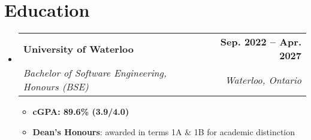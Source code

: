 \documentclass[letterpaper,11pt]{article}
\makeatletter
\newcommand{\resumeItem}[1]{
  \item\small{
    {#1 \vspace{-2pt}}
  }
}
\newcommand{\resumeSubheading}[4]{
  \vspace{-2pt}\item
    \begin{tabular*}{1.0\textwidth}[t]{l@{\extracolsep{\fill}}r}
      \textbf{#1} & \textbf{\small #2} \\
      \textit{\small#3} & \textit{\small #4} \\
    \end{tabular*}\vspace{-7pt}
}
\newcommand{\resumeSubHeadingListStart}{\begin{itemize}[leftmargin=0.0in, label={}]}
\newcommand{\resumeSubHeadingListEnd}{\end{itemize}}
\newcommand{\resumeItemListStart}{\begin{itemize}}
\newcommand{\resumeItemListEnd}{\end{itemize}\vspace{-5pt}}
\makeatother
\begin{document}
\section{Education}
\resumeSubHeadingListStart
    \resumeSubheading
    {University of Waterloo}{Sep. 2022 -- Apr. 2027}
    {Bachelor of Software Engineering, Honours (BSE)}{Waterloo, Ontario}
    \resumeItemListStart
        \resumeItem{\textbf{cGPA: 89.6\% (3.9/4.0)}}
        \resumeItem{\textbf{Dean's Honours}: awarded in terms 1A \& 1B for academic distinction}
    \resumeItemListEnd
\resumeSubHeadingListEnd
\end{document}
